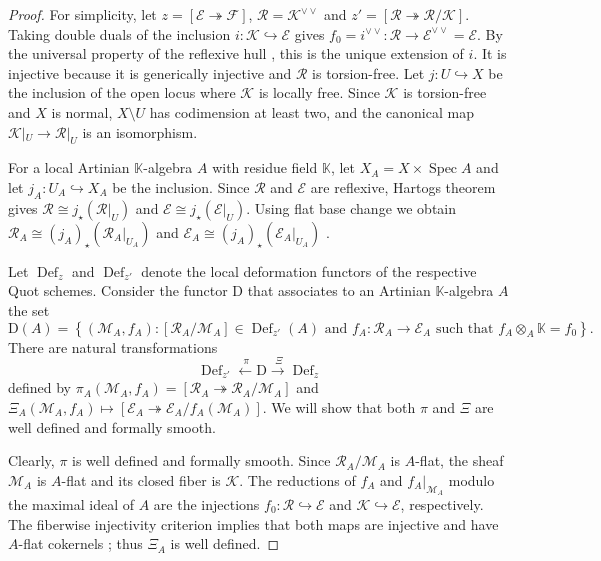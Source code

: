 \documentclass[leqno,11pt,a4paper]{amsart}
\theoremstyle{definition}
\numberwithin{equation}{section}
\newcommand{\kk}{\mathbb{K}}
\newcommand{\EE}{\mathscr{E}}
\newcommand{\FF}{\mathscr{F}}
\newcommand{\MM}{\mathscr{M}}
\newcommand{\RR}{\mathscr{R}}
\newcommand{\KK}{\mathscr{K}}
\DeclareMathOperator{\Def}{Def}
\DeclareMathOperator{\Spec}{Spec}
\begin{document}
\begin{proof} 
For simplicity, let $z = [\EE \twoheadrightarrow \FF]$, $\RR=\KK^{\vee\vee}$ and $z'=[\mathscr R\twoheadrightarrow\mathscr R/\KK]$.
Taking double duals of the inclusion $i:\KK\hookrightarrow\EE$ gives $f_0=i^{\vee\vee}:\RR\to\EE^{\vee\vee}=\EE$.
By the universal property of the reflexive hull \cite[\href{https://stacks.math.columbia.edu/tag/0EBH}{Tag 0EBH}]{stacks_project}, this is the unique extension of $i$.
It is injective because it is generically injective and $\mathscr R$ is torsion-free.
Let $j:U\hookrightarrow X$ be the inclusion of the open locus where $\KK$ is locally free.
Since $\KK$ is torsion-free and $X$ is normal, $X\setminus U$ has codimension at least two, and the canonical map $\KK|_U\to\mathscr R|_U$ is an isomorphism.

For a local Artinian $\kk$-algebra $A$ with residue field $\kk$, let $X_A=X\times\Spec A$ and let $j_A: U_A\hookrightarrow X_A$ be the inclusion.
Since $\RR$ and $\EE$ are reflexive, Hartogs theorem \cite[\href{https://stacks.math.columbia.edu/tag/0EBJ}{Tag 0EBJ}]{stacks_project} gives $\RR \cong j_\star(\RR|_U)$ and $\EE \cong j_\star(\EE|_U)$.
Using flat base change we obtain $\RR_A \cong (j_{A})_\star(\RR_A|_{U_A})$ and  $\EE_A\cong (j_{A})_\star(\EE_A|_{U_A})$ .

Let $\operatorname{Def}_z$ and $\operatorname{Def}_{z'}$ denote the local deformation functors of the respective Quot schemes. 
Consider the functor $\mathrm{D}$ that associates to an Artinian $\kk$-algebra $A$ the set
$$
\mathrm{D}(A)= \left\{ (\MM_A,f_A): [\RR_A/\MM_A] \in \Def_{z'}(A) \text{ and } f_A:\RR_A \to \EE_A \text{ such that } f_A\otimes_A \kk = f_0 \right\}.
$$
There are natural transformations
$$ \Def_{z'}  \xleftarrow{\ \pi } \mathrm{D} \xrightarrow{\ \Xi }\Def_z$$
defined by
$\pi_A(\MM_A,f_A) =[\RR_A \twoheadrightarrow \RR_A/ \MM_A]$ and $\Xi_A(\MM_A,f_A)\mapsto [\EE_A\twoheadrightarrow\EE_A/f_A(\MM_A)]$.
We will show that both $\pi$ and $\Xi$ are well defined and formally smooth. 

Clearly, $\pi$ is well defined and formally smooth. 
Since $\RR_A/\MM_A$ is $A$-flat, the sheaf $\MM_A$ is $A$-flat and its closed fiber is $\KK$. 
The reductions of $f_A$ and $f_A|_{\MM_A}$ modulo the maximal ideal of $A$ are the injections $f_0:\RR\hookrightarrow\EE$ and $\KK\hookrightarrow\EE$, respectively.
The fiberwise injectivity criterion implies that both maps are injective and have $A$-flat cokernels \cite[\href{https://stacks.math.columbia.edu/tag/00ME}{Tag 00ME}]{stacks_project}; thus $\Xi_A$ is well defined. 


\end{proof}
\end{document}
